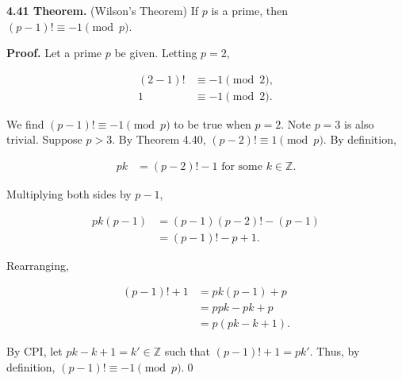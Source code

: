 \documentclass[12pt]{article}
\begin{document}
\noindent\textbf{4.41 Theorem.} (Wilson's Theorem) If $p$ is a prime, then $(p-1)! \equiv -1\pmod p$.

\bigskip

\noindent\textbf{Proof.} Let a prime $p$ be given. Letting $p=2$, 

\begin{align*}
(2-1)! &\equiv -1\pmod 2, \\
1 &\equiv -1\pmod 2.
\end{align*}

\noindent We find $(p-1)! \equiv -1\pmod p$ to be true when $p=2$. Note $p=3$ is also trivial. Suppose $p>3$. By Theorem 4.40, $(p-2)!\equiv 1\pmod p$. By definition,

\begin{align*}
pk &= (p-2)!-1 \text{ for some } k\in\mathbb{Z}.
\end{align*}

\noindent Multiplying both sides by $p-1$,

\begin{align*}
pk(p-1) &= (p-1)(p-2)!-(p-1) \\
&= (p-1)! - p + 1.
\end{align*}

\noindent Rearranging,

\begin{align*}
(p-1)!+1 &= pk(p-1)+p \\
&= ppk-pk+p\\
&= p(pk-k+1).
\end{align*}

\noindent By CPI, let $pk-k+1=k'\in\mathbb{Z}$ such that $(p-1)!+1=pk'$. Thus, by definition, $(p-1)! \equiv -1\pmod p$.\qed
\end{document}
